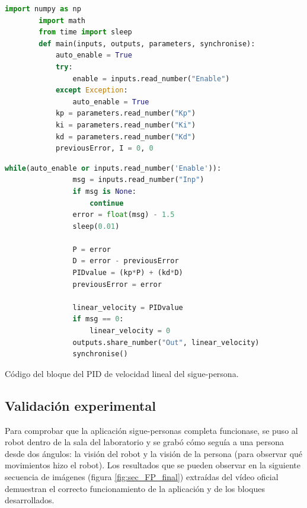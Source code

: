 \begin{code}[H]
    \begin{lstlisting}[language=python]
        import numpy as np
        import math
        from time import sleep
        def main(inputs, outputs, parameters, synchronise):
            auto_enable = True
            try:
                enable = inputs.read_number("Enable")
            except Exception:
                auto_enable = True
            kp = parameters.read_number("Kp")
            ki = parameters.read_number("Ki")
            kd = parameters.read_number("Kd")
            previousError, I = 0, 0
    \end{lstlisting}
\end{code}
\begin{code}[H]
    \begin{lstlisting}[language=python]
            while(auto_enable or inputs.read_number('Enable')):
                msg = inputs.read_number("Inp")
                if msg is None:
                    continue
                error = float(msg) - 1.5
                sleep(0.01)
        
                P = error
                D = error - previousError
                PIDvalue = (kp*P) + (kd*D)
                previousError = error
    
                linear_velocity = PIDvalue
                if msg == 0:
                    linear_velocity = 0
                outputs.share_number("Out", linear_velocity)
                synchronise()
    \end{lstlisting}
    \caption[Código bloque PID lineal sigue-persona]{Código del bloque del PID de velocidad lineal del sigue-persona.}
    \label{cod:PID_linear_FP}
\end{code}

\subsection{Validación experimental}
\label{subsec:FP2_val}

Para comprobar que la aplicación sigue-personas completa funcionase, se puso al robot dentro de la sala del laboratorio y se grabó cómo seguía a una persona
desde dos ángulos: la visión del robot y la visión de la persona (para observar qué movimientos hizo el robot). Los resultados que se pueden observar en la siguiente
secuencia de imágenes (figura \ref{fig:sec_FP_final}) extraídas del vídeo oficial demuestran el correcto funcionamiento de la aplicación y de los bloques desarrollados.\\




